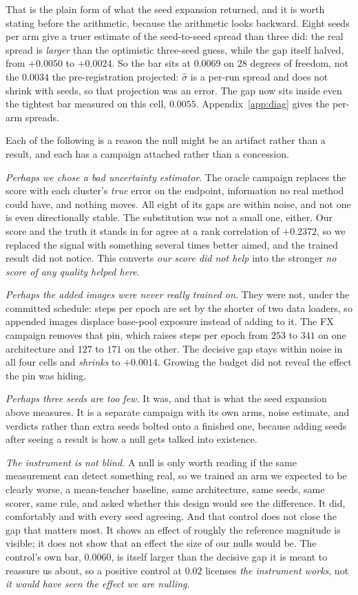 \documentclass{article}
\begin{document}
That is the plain form of what the seed expansion returned, and it is worth stating before the arithmetic, because the
arithmetic looks backward. Eight seeds per arm give a truer estimate of the seed-to-seed spread
than three did: the real spread is \emph{larger} than the optimistic three-seed guess, while the gap
itself halved, from $+0.0050$ to $+0.0024$. So the bar sits at $0.0069$ on $28$ degrees of freedom,
not the $0.0034$ the pre-registration projected: $\hat{\sigma}$ is a per-run spread and does not
shrink with seeds, so that projection was an error. The gap now sits inside even the tightest bar
measured on this cell, $0.0055$. Appendix~\ref{app:diag} gives the per-arm spreads.

Each of the following is a reason the null might be an artifact rather than a result, and each has a campaign attached rather than a concession.

\emph{Perhaps we chose a bad uncertainty estimator}. The oracle campaign replaces the score with each cluster's \emph{true} error on the endpoint, information no real method could have, and nothing moves. All eight of its gaps are within noise, and not one is even directionally stable.
The substitution was not a small one, either. Our score and the truth it stands in for agree at a
rank correlation of $+0.2372$, so we replaced the signal with something several times better aimed, and the trained result did not notice. This converts \emph{our score did not help} into the stronger \emph{no score of any quality helped here}.

\emph{Perhaps the added images were never really trained on.} They were not, under the committed
schedule: steps per epoch are set by the shorter of two data loaders, so appended images displace
base-pool exposure instead of adding to it. The FX campaign removes that pin, which raises steps per
epoch from $253$ to $341$ on one architecture and $127$ to $171$ on the other. The decisive gap
stays within noise in all four cells and \emph{shrinks} to $+0.0014$. Growing the budget did not
reveal the effect the pin was hiding.

\emph{Perhaps three seeds are too few.} It was, and that is what the seed expansion above measures.
It is a separate campaign with its own arms, noise estimate, and verdicts rather than extra seeds
bolted onto a finished one, because adding seeds after seeing a result is how a null gets talked
into existence.

\emph{The instrument is not blind.} A null is only worth reading if the same measurement can
detect something real, so we trained an arm we expected to be clearly worse, a mean-teacher
baseline, same architecture, same seeds, same scorer, same rule, and asked whether this design
would see the difference. It did, comfortably and with every seed agreeing. And that control does not close the gap that matters most. It shows an effect of roughly the reference magnitude is visible; it does not show that an effect the size of our nulls would be.
The control's own bar, $0.0060$, is itself larger than the decisive gap it is meant to reassure us
about, so a positive control at $0.02$ licenses \emph{the instrument works}, not \emph{it would have
seen the effect we are nulling}.
\end{document}
